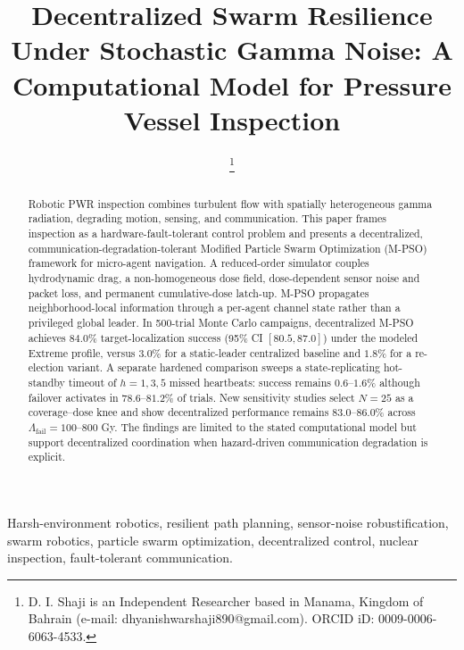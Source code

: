 \documentclass[conference]{IEEEtran}
\begin{document}
\title{Decentralized Swarm Resilience Under Stochastic Gamma Noise: A Computational Model for Pressure Vessel Inspection}

\author{
\thanks{D. I. Shaji is an Independent Researcher based in Manama, Kingdom of Bahrain (e-mail: dhyanishwarshaji890@gmail.com). ORCID iD: 0009-0006-6063-4533.}
}
\maketitle

\begin{abstract}
Robotic PWR inspection combines turbulent flow with spatially heterogeneous gamma radiation, degrading motion, sensing, and communication. This paper frames inspection as a hardware-fault-tolerant control problem and presents a decentralized, communication-degradation-tolerant Modified Particle Swarm Optimization (M-PSO) framework for micro-agent navigation. A reduced-order simulator couples hydrodynamic drag, a non-homogeneous dose field, dose-dependent sensor noise and packet loss, and permanent cumulative-dose latch-up. M-PSO propagates neighborhood-local information through a per-agent channel state rather than a privileged global leader. In 500-trial Monte Carlo campaigns, decentralized M-PSO achieves $84.0\%$ target-localization success (95\% CI $[80.5,87.0]$) under the modeled Extreme profile, versus $3.0\%$ for a static-leader centralized baseline and $1.8\%$ for a re-election variant. A separate hardened comparison sweeps a state-replicating hot-standby timeout of $h=1,3,5$ missed heartbeats: success remains $0.6$--$1.6\%$ although failover activates in $78.6$--$81.2\%$ of trials. New sensitivity studies select $N=25$ as a coverage--dose knee and show decentralized performance remains $83.0$--$86.0\%$ across $\Lambda_{\text{fail}}=100$--800 Gy. The findings are limited to the stated computational model but support decentralized coordination when hazard-driven communication degradation is explicit.
\end{abstract}

\begin{IEEEkeywords}
Harsh-environment robotics, resilient path planning, sensor-noise robustification, swarm robotics, particle swarm optimization, decentralized control, nuclear inspection, fault-tolerant communication.
\end{IEEEkeywords}
\end{document}
